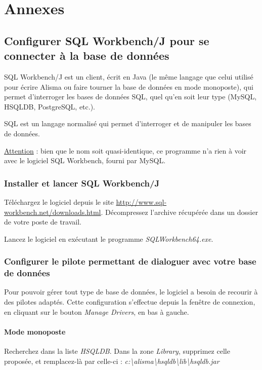 \chapter{Annexes}
\section{Configurer SQL Workbench/J pour se connecter à la base de données}
\label{sqlworkbenchj}

SQL Workbench/J est un client, écrit en Java (le même langage que celui utilisé pour écrire Alisma ou faire tourner la base de données en mode monoposte), qui permet d'interroger les bases de données SQL, quel qu'en soit leur type (MySQL, HSQLDB, PostgreSQL, etc.).

SQL est un langage normalisé qui permet d'interroger et de manipuler les bases de données. 

\underline{Attention} : bien que le nom soit quasi-identique, ce programme n'a rien à voir avec le logiciel SQL Workbench, fourni par MySQL.

\subsection{Installer et lancer SQL Workbench/J}

Téléchargez le logiciel depuis le site \url{http://www.sql-workbench.net/downloads.html}. Décompressez l'archive récupérée dans un dossier de votre poste de travail.

Lancez le logiciel en exécutant le programme \textit{SQLWorkbench64.exe}.

\subsection{Configurer le pilote permettant de dialoguer avec votre base de données}

Pour pouvoir gérer tout type de base de données, le logiciel a besoin de recourir à des pilotes adaptés. Cette configuration s'effectue depuis la fenêtre de connexion, en cliquant sur le bouton \textit{Manage Drivers}, en bas à gauche.

\subsubsection{Mode monoposte}
Recherchez dans la liste \textit{HSQLDB}. Dans la zone \textit{Library}, supprimez celle proposée, et remplacez-là par celle-ci : \textit{\NoAutoSpaceBeforeFDP c:\textbackslash{}alisma\textbackslash{}hsqldb\textbackslash{}lib\textbackslash{}hsqldb.jar}

